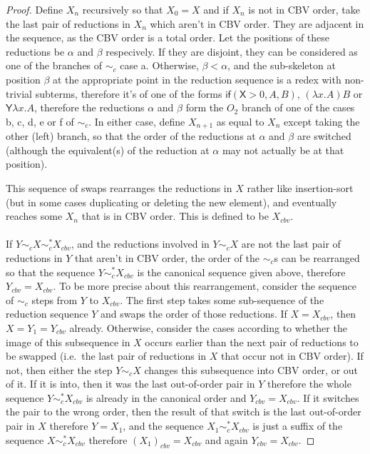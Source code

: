 \documentclass{article}
\newcommand{\tY}{\mathsf{Y}}
\newcommand{\tif}[3]{\mathsf{if}(#1, #2, #3)} %
\newcommand{\skeletonPlaceholder}{\mathsf{X}} %
\theoremstyle{definition}
\theoremstyle{lemma}
\theoremstyle{remark}
\begin{document}

\begin{proof}

Define $X_n$ recursively so that $X_0 = X$ and if $X_n$ is not in CBV order, take the last pair of reductions in $X_n$ which aren't in CBV order. They are adjacent in the sequence, as the CBV order is a total order. Let the positions of these reductions be $\alpha$ and $\beta$ respecively. If they are disjoint, they can be considered as one of the branches of $\sim_c$ case a. Otherwise, $\beta < \alpha$, and the sub-skeleton at position $\beta$ at the appropriate point in the reduction sequence is a redex with non-trivial subterms, therefore it's of one of the forms $\tif{\skeletonPlaceholder>0}{A}{B}$, $(\lambda x.A) B$ or $\tY \lambda x. A$, therefore the reductions $\alpha$ and $\beta$ form the $O_2$ branch of one of the cases b, c, d, e or f of $\sim_c$. In either case, define $X_{n+1}$ as equal to $X_n$ except taking the other (left) branch, so that the order of the reductions at $\alpha$ and $\beta$ are switched (although the equivalent(s) of the reduction at $\alpha$ may not actually be at that position).

This sequence of swaps rearranges the reductions in $X$ rather like insertion-sort (but in some cases duplicating or deleting the new element), and eventually reaches some $X_n$ that is in CBV order. This is defined to be $X_{cbv}$.

\paragraph{}
If $Y \sim_c X \sim_c^* X_{cbv}$, and the reductions involved in $Y \sim_c X$ are not the last pair of reductions in $Y$ that aren't in CBV order, the order of the $\sim_c$s can be rearranged so that the sequence $Y \sim_c^* X_{cbv}$ is the canonical sequence given above, therefore $Y_{cbv} = X_{cbv}$. To be more precise about this rearrangement, consider the sequence of $\sim_c$ steps from $Y$ to $X_{cbv}$. The first step takes some sub-sequence of the reduction sequence $Y$ and swaps the order of those reductions. If $X = X_{cbv}$, then $X = Y_1 = Y_{cbv}$ already. Otherwise, consider the cases according to whether the image of this subsequence in $X$ occurs earlier than the next pair of reductions to be swapped (i.e.~the last pair of reductions in $X$ that occur not in CBV order). If not, then either the step $Y \sim_c X$ changes this subsequence into CBV order, or out of it. If it is into, then it was the last out-of-order pair in $Y$ therefore the whole sequence $Y \sim_c^* X_{cbv}$ is already in the canonical order and $Y_{cbv} = X_{cbv}$. If it switches the pair to the wrong order, then the result of that switch is the last out-of-order pair in $X$ therefore $Y = X_1$, and the sequence $X_1 \sim_c^* X_{cbv}$ is just a suffix of the sequence $X \sim_c^* X_{cbv}$ therefore $(X_1)_{cbv} = X_{cbv}$ and again $Y_{cbv} = X_{cbv}$.


\end{proof}
\end{document}
